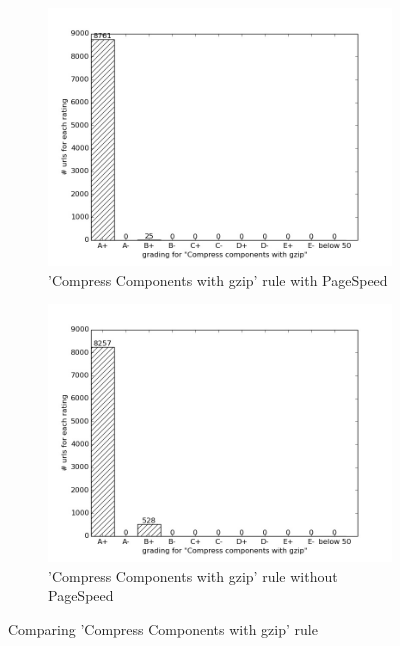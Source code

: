 \documentclass[conference]{IEEEtran}
\begin{document}
\begin{figure}
    \centering
    \begin{subfigure}[b]{\columnwidth}        %
        \centering
	\includegraphics[scale=0.33]{new-img-jpg/container-jpg/Compress components with gzip.jpg}
        \caption{'Compress Components with gzip' rule with PageSpeed}
        \label{fig:ccg-pagespeed}
    \end{subfigure}
    \hfill
    \begin{subfigure}[b]{\columnwidth}        %
        \centering
	 \includegraphics[scale=0.33]{new-img-jpg/deploy-jpg/Compress components with gzip.jpg}
        \caption{'Compress Components with gzip' rule without PageSpeed}
        \label{fig:ccg-nopagespeed}
    \end{subfigure}
    \caption{Comparing 'Compress Components with gzip' rule}
    \label{fig:ccg-comparison}
\end{figure}
\end{document}
